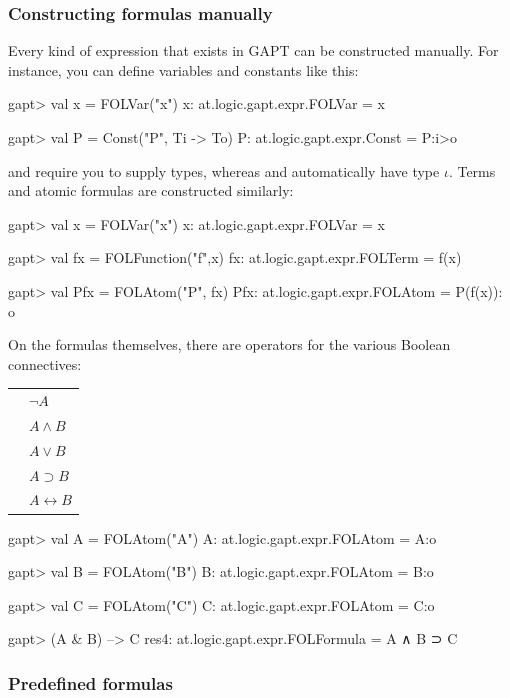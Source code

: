 \documentclass[a4paper,11pt]{article}
\newcommand{\cli}[1]{{\ttfamily {#1}}}
\begin{document}
\subsubsection{Constructing formulas manually}
Every kind of expression that exists in GAPT can be constructed manually. For instance, you can define variables
and constants like this:
\begin{clilisting}
gapt> val x = FOLVar("x")
x: at.logic.gapt.expr.FOLVar = x

gapt> val P = Const("P", Ti -> To)
P: at.logic.gapt.expr.Const = P:i>o

\end{clilisting}
\cli{Var} and \cli{Const} require you to supply types, whereas \cli{FOLVar} and
\cli{FOLConst} automatically have type $\iota$. Terms and atomic formulas are constructed
similarly:
\begin{clilisting}
gapt> val x = FOLVar("x")
x: at.logic.gapt.expr.FOLVar = x

gapt> val fx = FOLFunction("f",x)
fx: at.logic.gapt.expr.FOLTerm = f(x)

gapt> val Pfx = FOLAtom("P", fx)
Pfx: at.logic.gapt.expr.FOLAtom = P(f(x)): o

\end{clilisting}

On the formulas themselves, there are operators for the various Boolean connectives:

\begin{tabular}{r l}
 \cli{-A} & $\neg A$\\
 \cli{A \& B} & $A \wedge B$\\
 \cli{A | B} & $A \vee B$\\
 \cli{A --> B} & $A \supset B$\\
 \cli{A <-> B} & $A \leftrightarrow B$
\end{tabular}
 
\begin{clilisting}
gapt> val A = FOLAtom("A")
A: at.logic.gapt.expr.FOLAtom = A:o

gapt> val B = FOLAtom("B")
B: at.logic.gapt.expr.FOLAtom = B:o

gapt> val C = FOLAtom("C")
C: at.logic.gapt.expr.FOLAtom = C:o

gapt> (A & B) --> C
res4: at.logic.gapt.expr.FOLFormula = A ∧ B ⊃ C

\end{clilisting}

\subsubsection{Predefined formulas}
\end{document}
